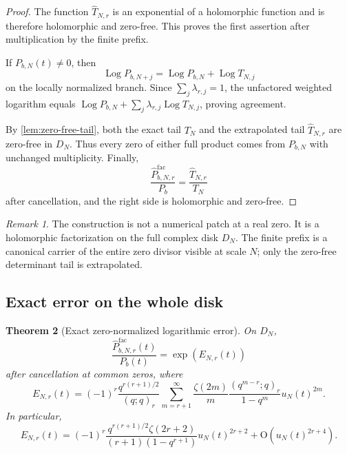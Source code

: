 \documentclass[11pt,oneside]{article}
\numberwithin{equation}{section}
\theoremstyle{frontier}
\newtheorem{theorem}{Theorem}[section]
\theoremstyle{definition}
\theoremstyle{remark}
\newtheorem{remark}[theorem]{Remark}
\newcommand{\Log}{\operatorname{Log}}
\newcommand{\bigO}{\mathrm O}
\begin{document}
\begin{proof}
The function $\widehat T_{N,r}$ is an exponential of a holomorphic function and is therefore
holomorphic and zero-free.  This proves the first assertion after multiplication by the
finite prefix.

If $P_{b,N}(t)\ne0$, then
\[
 \Log P_{b,N+j}=\Log P_{b,N}+\Log T_{N,j}
\]
on the locally normalized branch.  Since $\sum_j\lambda_{r,j}=1$, the unfactored weighted
logarithm equals $\Log P_{b,N}+\sum_j\lambda_{r,j}\Log T_{N,j}$, proving agreement.

By \cref{lem:zero-free-tail}, both the exact tail $T_N$ and the extrapolated tail
$\widehat T_{N,r}$ are zero-free in $D_N$.  Thus every zero of either full product comes
from $P_{b,N}$ with unchanged multiplicity.  Finally,
\[
 \frac{\widehat P^{\mathrm{fac}}_{b,N,r}}{P_b}
 =\frac{\widehat T_{N,r}}{T_N}
\]
after cancellation, and the right side is holomorphic and zero-free.
\end{proof}

\begin{remark}
The construction is not a numerical patch at a real zero.  It is a holomorphic factorization
on the full complex disk $D_N$.  The finite prefix is a canonical carrier of the entire zero
divisor visible at scale $N$; only the zero-free determinant tail is extrapolated.
\end{remark}

\subsection{Exact error on the whole disk}

\begin{theorem}[Exact zero-normalized logarithmic error]\label{thm:exact-error}
On $D_N$,
\begin{equation}
 \frac{\widehat P^{\mathrm{fac}}_{b,N,r}(t)}{P_b(t)}
 =\exp(E_{N,r}(t))
 \label{eq:quotient-error}
\end{equation}
after cancellation at common zeros, where
\begin{equation}
 \boxed{
 E_{N,r}(t)=(-1)^r\frac{q^{r(r+1)/2}}{(q;q)_r}
 \sum_{m=r+1}^{\infty}\frac{\zeta(2m)}{m}
 \frac{(q^{m-r};q)_r}{1-q^m}
 u_N(t)^{2m}.}
 \label{eq:exact-E}
\end{equation}
In particular,
\begin{equation}
 E_{N,r}(t)
 =(-1)^r\frac{q^{r(r+1)/2}\zeta(2r+2)}
 {(r+1)(1-q^{r+1})}u_N(t)^{2r+2}
 +\bigO(u_N(t)^{2r+4}).
 \label{eq:leading-E}
\end{equation}
\end{theorem}
\end{document}
